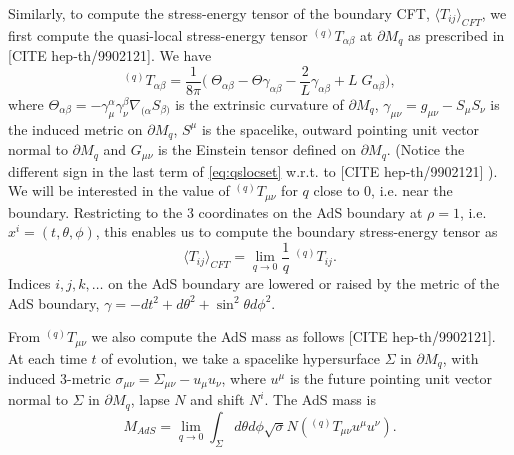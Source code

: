 \documentclass[a4paper,11pt]{article}
\begin{document}
Similarly, to compute the stress-energy tensor of the boundary CFT, $\langle T_{ij}\rangle_{CFT}$, we first compute the quasi-local stress-energy tensor $^{(q)}T_{\alpha\beta}$ at $\partial M_q$ as prescribed in  [CITE hep-th/9902121]. We have
\begin{equation}
\label{eq:qslocset}
^{(q)}T_{\alpha\beta}=\frac{1}{8\pi}\biggl(\;   \Theta_{\alpha\beta}-\Theta \gamma_{\alpha\beta}-\frac{2}{L}\gamma_{\alpha\beta}+L \;G_{\alpha\beta} \biggr),
\end{equation}
where $\Theta_{\alpha\beta}=-\gamma^\alpha_{\mu}\gamma^\beta_\nu\nabla_{(\alpha}S_{\beta)}$ is the extrinsic curvature of $\partial M_q$, $\gamma_{\mu\nu}=g_{\mu\nu}-S_\mu S_\nu$ is the induced metric on $\partial M_q$, $S^\mu$ is the spacelike, outward pointing unit vector normal to $\partial M_q$ and $G_{\mu\nu}$ is the Einstein tensor defined on $\partial M_q$. (Notice the different sign in the last term of \eqref{eq:qslocset} w.r.t. to  [CITE hep-th/9902121] ). We will be interested in the value of $^{(q)}T_{\mu\nu}$ for $q$ close to 0, i.e. near the boundary.
Restricting to the 3 coordinates on the AdS boundary at $\rho=1$, i.e. $x^i=(t,\theta,\phi)$, this enables us to compute the boundary stress-energy tensor as
\begin{equation}
\langle T_{ij}\rangle_{CFT}=\lim_{q\to0}\frac{1}{q}  \;^{(q)}T_{ij}.
\end{equation}
Indices $i,j,k,\dots$ on the AdS boundary are lowered or raised by the metric of the AdS boundary, $\gamma=-dt^2+d\theta^2+\sin^2\theta d\phi^2$.

From $^{(q)}T_{\mu\nu}$ we also compute the AdS mass as follows [CITE hep-th/9902121]. At each time $t$ of evolution, we take a spacelike hypersurface $\Sigma$ in $\partial M_q$, with induced 3-metric $\sigma_{\mu\nu}=\Sigma_{\mu\nu}-u_\mu u_\nu$, where $u^\mu$ is the future pointing unit vector normal to $\Sigma$ in $\partial M_q$, lapse $N$ and shift $N^i$. The AdS mass is
\begin{equation}
M_{AdS}=\lim_{q\to0}\int_\Sigma d\theta d\phi \sqrt{\sigma} N ( ^{(q)}T_{\mu\nu} u^\mu u^\nu).
\end{equation}
\end{document}
